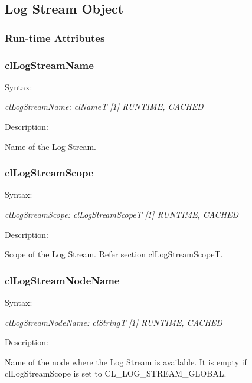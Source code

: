 \begin{flushleft}
\section{Log Stream Object}
\subsubsection{Run-time Attributes}

\subsubsection{clLogStreamName}
\begin{Desc}
\item[Syntax:]
\end{Desc}
\textit{clLogStreamName: clNameT [1] {RUNTIME, CACHED}}
\begin{Desc}
\item[Description:]
\end{Desc}
Name of the Log Stream.



\subsubsection{clLogStreamScope}
\begin{Desc}
\item[Syntax:]
\end{Desc}
\textit{clLogStreamScope: clLogStreamScopeT [1] {RUNTIME, CACHED}}
\begin{Desc}
\item[Description:]
\end{Desc}
Scope of the Log Stream. Refer section clLogStreamScopeT.



\subsubsection{clLogStreamNodeName}
\begin{Desc}
\item[Syntax:]
\end{Desc}
\textit{clLogStreamNodeName: clStringT [1] {RUNTIME, CACHED}}
\begin{Desc}
\item[Description:]
\end{Desc}
Name of the node where the Log Stream is available. It is empty if clLogStreamScope is set to CL\_\-LOG\_\-STREAM\_\-GLOBAL.



\end{flushleft}
